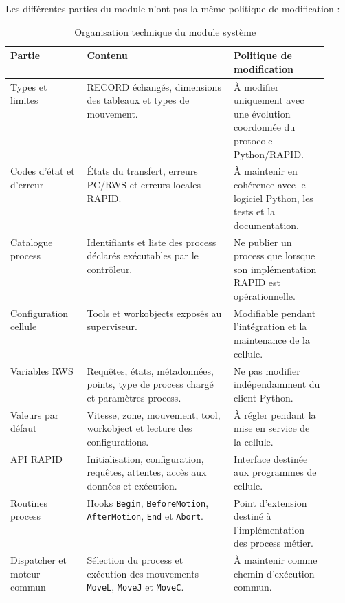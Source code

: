 \documentclass{rapportENSAM}
\begin{document}
Les différentes parties du module n'ont pas la même politique de modification :

\begin{table}[ht]
    \centering
    \small
    \begin{tabularx}{\linewidth}{
        |p{0.24\linewidth}
        |X
        |p{0.30\linewidth}|
    }
        \hline
        \textbf{Partie} &
        \textbf{Contenu} &
        \textbf{Politique de modification} \\
        \hline

        Types et limites &
        RECORD échangés, dimensions des tableaux et types de mouvement. &
        À modifier uniquement avec une évolution coordonnée du protocole
        Python/RAPID. \\
        \hline

        Codes d'état et d'erreur &
        États du transfert, erreurs PC/RWS et erreurs locales RAPID. &
        À maintenir en cohérence avec le logiciel Python, les tests et la
        documentation. \\
        \hline

        Catalogue process &
        Identifiants et liste des process déclarés exécutables par le
        contrôleur. &
        Ne publier un process que lorsque son implémentation RAPID est
        opérationnelle. \\
        \hline

        Configuration cellule &
        Tools et workobjects exposés au superviseur. &
        Modifiable pendant l'intégration et la maintenance de la cellule. \\
        \hline

        Variables RWS &
        Requêtes, états, métadonnées, points, type de process chargé et
        paramètres process. &
        Ne pas modifier indépendamment du client Python. \\
        \hline

        Valeurs par défaut &
        Vitesse, zone, mouvement, tool, workobject et lecture des
        configurations. &
        À régler pendant la mise en service de la cellule. \\
        \hline

        API RAPID &
        Initialisation, configuration, requêtes, attentes, accès aux données et
        exécution. &
        Interface destinée aux programmes de cellule. \\
        \hline

        Routines process &
        Hooks \texttt{Begin}, \texttt{BeforeMotion},
        \texttt{AfterMotion}, \texttt{End} et \texttt{Abort}. &
        Point d'extension destiné à l'implémentation des process métier. \\
        \hline

        Dispatcher et moteur commun &
        Sélection du process et exécution des mouvements
        \texttt{MoveL}, \texttt{MoveJ} et \texttt{MoveC}. &
        À maintenir comme chemin d'exécution commun. \\
        \hline
    \end{tabularx}
    \caption{Organisation technique du module système}
    \label{tab:rapid-module-contents}
\end{table}
\end{document}
